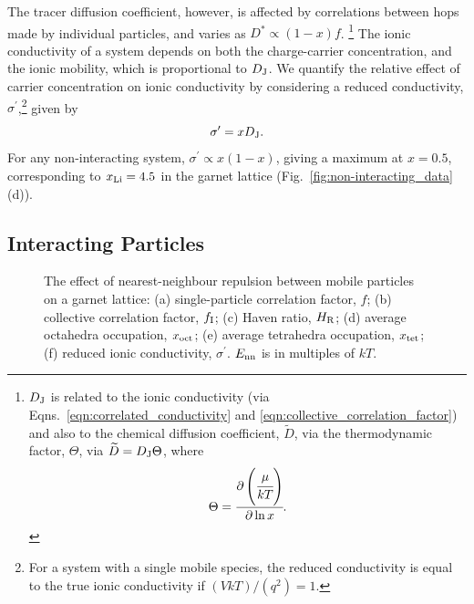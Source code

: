 \documentclass[aps,prb,twocolumn,superscriptaddress,reprint]{revtex4-1}
\newcommand{\xLi}{x_\m{Li}}
\begin{document}
The tracer diffusion coefficient, however, is affected by correlations between hops made by individual particles, and varies as $D^*\propto(1-x)f$. 
\footnote{$D_{\mathrm{J}}$ is related to the ionic conductivity (via Eqns.~\ref{eqn:correlated_conductivity} and \ref{eqn:collective_correlation_factor}) and also to the chemical diffusion coefficient, ${\widetilde{D}}$, via the thermodynamic factor, $\Theta$, via ${\widetilde{D}}=D_{\mathrm{J}}\Theta$, where
\begin{equation}
  \Theta = \cfrac{\partial\left(\cfrac{\mu}{kT}\right)}{\partial \ln x}.
\end{equation}}
The ionic conductivity of a system depends on both the charge-carrier concentration, and the ionic mobility, which is proportional to $D_{\mathrm{J}}$. We quantify the relative effect of carrier concentration on ionic conductivity by
considering a reduced conductivity, $\sigma^\prime$,\footnote{For a system with a single mobile species, the reduced conductivity is equal to the true ionic conductivity if $(VkT)/(q^2)=1$.} given by
\begin{equation}
  \label{eqn:reduced_sigma}
  \sigma^\prime = xD_{\mathrm{J}}.
\end{equation}
For any non-interacting system, $\sigma^\prime\propto x\left(1-x\right)$, giving a maximum at $x=0.5$, corresponding to $\xLi=4.5$ in the garnet lattice (Fig.~\ref{fig:non-interacting_data}(d)).

\subsection{Interacting Particles}

\begin{figure}[tb]
  \centering
    \caption{\label{fig:nearest_neighbour_data}The effect of nearest-neighbour repulsion between mobile particles on a garnet lattice: (a) single-particle correlation factor, $f$; (b) collective correlation factor, $f_{\mathrm{I}}$; (c) Haven ratio, $H_{\mathrm{R}}$; (d) average octahedra occupation, $x_{\mathrm{oct}}$; (e) average tetrahedra occupation, $x_{\mathrm{tet}}$; (f) reduced ionic conductivity, $\sigma^\prime$. $E_{\mathrm{nn}}$ is in multiples of $kT$.}
\end{figure}
\end{document}
